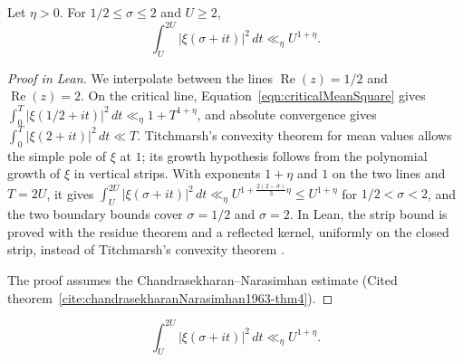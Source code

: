\begin{lemma}

\label{lemma:xiMeanValue}


\leanok



 Let $\eta>0$. For $1/2\leq\sigma\leq2$ and $U\geq2$, \begin{equation*} \int_U^{2U}|\xi(\sigma+it)|^2\,dt \ll_\eta U^{1+\eta}. \end{equation*} 

\end{lemma}

\begin{proof}[Proof in Lean]

\leanok


We interpolate between the lines $\operatorname{Re}(z)=1/2$ and $\operatorname{Re}(z)=2$. On the critical line, Equation~\ref{eqn:criticalMeanSquare} gives $\int_0^T|\xi(1/2+it)|^2\,dt\ll_\eta1+T^{1+\eta}$, and absolute convergence gives $\int_0^T|\xi(2+it)|^2\,dt\ll T$. Titchmarsh's convexity theorem for mean values \cite[\S7.8, (7.8.3)]{titchmarsh1986} allows the simple pole of $\xi$ at $1$; its growth hypothesis follows from the polynomial growth of $\xi$ in vertical strips. With exponents $1+\eta$ and $1$ on the two lines and $T=2U$, it gives $\int_U^{2U}|\xi(\sigma+it)|^2\,dt\ll_\eta U^{1+\frac{2(2-\sigma)}{3}\eta}\leq U^{1+\eta}$ for $1/2<\sigma<2$, and the two boundary bounds cover $\sigma=1/2$ and $\sigma=2$. In Lean, the strip bound is proved with the residue theorem and a reflected kernel, uniformly on the closed strip, instead of Titchmarsh's convexity theorem \cite[\S7.8, (7.8.3)]{titchmarsh1986}.

The proof assumes the Chandrasekharan--Narasimhan estimate (Cited theorem~\ref{cite:chandrasekharanNarasimhan1963-thm4}).

\end{proof}

\begin{equationnode}

\label{eqn:xiMeanBound}


\leanok



\begin{equation*} \int_U^{2U}|\xi(\sigma+it)|^2\,dt \ll_\eta U^{1+\eta}. \end{equation*}

\end{equationnode}

